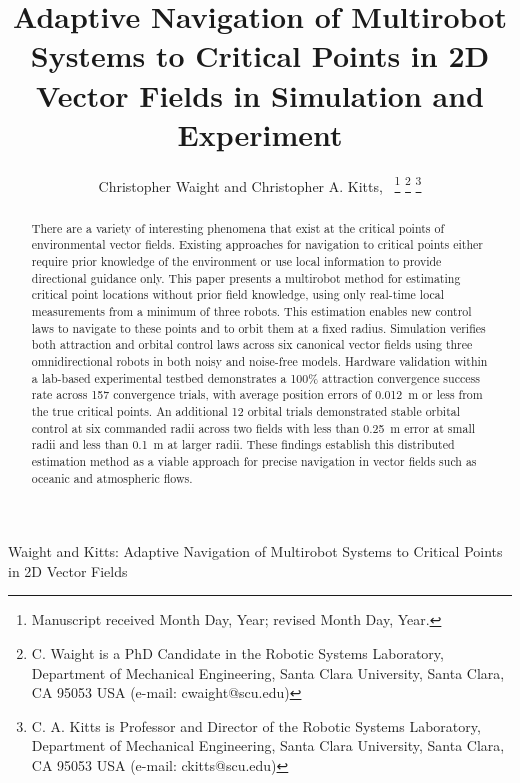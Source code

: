 \documentclass[lettersize,journal]{IEEEtran}
\begin{document}
\title{Adaptive Navigation of Multirobot Systems to Critical Points in 2D Vector Fields in Simulation and Experiment}
\author{Christopher Waight and Christopher A. Kitts,~
\thanks{Manuscript received Month Day, Year; revised Month Day, Year.}
\thanks{C. Waight is a PhD Candidate in the Robotic Systems Laboratory, Department of Mechanical Engineering, Santa Clara University, Santa Clara, CA 95053 USA (e-mail: cwaight@scu.edu)}
\thanks{C. A. Kitts is Professor and Director of the Robotic Systems Laboratory, Department of Mechanical Engineering, Santa Clara University, Santa Clara, CA 95053 USA (e-mail: ckitts@scu.edu)}
}
%
{Waight and Kitts: Adaptive Navigation of Multirobot Systems to Critical Points in 2D Vector Fields}


\maketitle

\begin{abstract}
    There are a variety of interesting phenomena that exist at the critical points of environmental vector fields. Existing approaches for navigation to critical points either require prior knowledge of the environment or use local information to provide directional guidance only. This paper presents a multirobot method for estimating critical point locations without prior field knowledge, using only real-time local measurements from a minimum of three robots.
    This estimation enables new control laws to navigate to these points and to orbit them at a fixed radius.
    Simulation verifies both attraction and orbital control laws across six canonical vector fields using three omnidirectional robots in both noisy and noise-free models. Hardware validation within a lab-based experimental testbed demonstrates a 100\% attraction convergence success rate across 157 convergence trials, with average position errors of 0.012~m or less from the true critical points. An additional 12 orbital trials demonstrated stable orbital control at six commanded radii across two fields with less than 0.25~m error at small radii and less than 0.1~m at larger radii. These findings establish this distributed estimation method as a viable approach for precise navigation in vector fields such as oceanic and atmospheric flows.  

\end{abstract}
\end{document}

